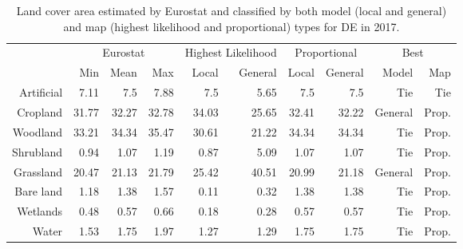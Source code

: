 \begin{table}[H]
\centering
\caption{Land cover area estimated by Eurostat and classified by both model (local and general) and map (highest likelihood and proportional) types for DE in 2017.}

\begin{tabular}{r|rrr|rr|rr|rr}
\toprule
{} & \multicolumn{3}{|c}{Eurostat} & \multicolumn{2}{|c}{Highest Likelihood} & \multicolumn{2}{|c}{Proportional} & \multicolumn{2}{|c}{Best} \\
{} &      Min &   Mean &    Max &              Local & General &        Local & General &    Model &    Map \\
\midrule
Artificial &     7.11 &    7.5 &   7.88 &                7.5 &    5.65 &          7.5 &     7.5 &      Tie &    Tie \\
Cropland   &    31.77 &  32.27 &  32.78 &              34.03 &   25.65 &        32.41 &   32.22 &  General &  Prop. \\
Woodland   &    33.21 &  34.34 &  35.47 &              30.61 &   21.22 &        34.34 &   34.34 &      Tie &  Prop. \\
Shrubland  &     0.94 &   1.07 &   1.19 &               0.87 &    5.09 &         1.07 &    1.07 &      Tie &  Prop. \\
Grassland  &    20.47 &  21.13 &  21.79 &              25.42 &   40.51 &        20.99 &   21.18 &  General &  Prop. \\
Bare land  &     1.18 &   1.38 &   1.57 &               0.11 &    0.32 &         1.38 &    1.38 &      Tie &  Prop. \\
Wetlands   &     0.48 &   0.57 &   0.66 &               0.18 &    0.28 &         0.57 &    0.57 &      Tie &  Prop. \\
Water      &     1.53 &   1.75 &   1.97 &               1.27 &    1.29 &         1.75 &    1.75 &      Tie &  Prop. \\
\bottomrule
\end{tabular}
\end{table}

